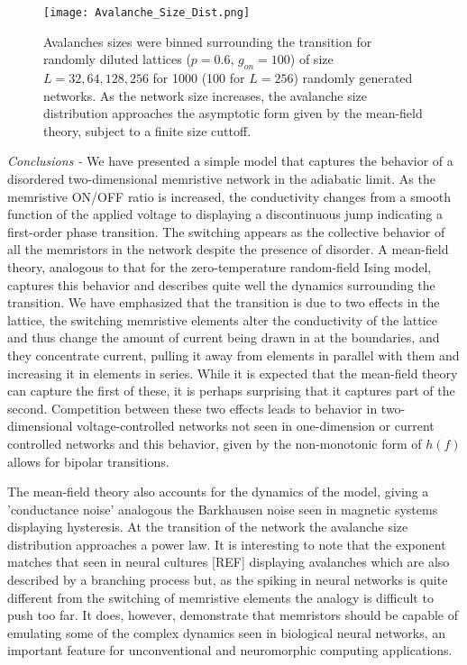 \documentclass[aps,prl,reprint,groupedaddress]{revtex4-1}
\begin{document}
\begin{figure}
\texttt{[image: Avalanche\_Size\_Dist.png]}
\caption{Avalanches sizes were binned surrounding the transition for randomly
diluted lattices ($p=0.6,\,g_{on}=100$) of size $L=32, 64, 128, 256$ for 1000
(100 for $L=256$) randomly generated networks.  As the network size increases,
the avalanche size distribution approaches the asymptotic form given by the
mean-field theory, subject to a finite size cuttoff.
\label{Avalanche_fig}}
\end{figure}

{\it Conclusions - } We have presented a simple model that captures the behavior of a disordered two-dimensional memristive
network in the adiabatic limit.  As the memristive ON/OFF ratio is increased,
the conductivity changes from a smooth function of the applied voltage to
displaying a discontinuous jump indicating a first-order phase transition. The switching appears as the collective behavior of all the memristors 
in the network despite the presence of disorder. 
A mean-field theory, analogous to that for the zero-temperature random-field Ising model, captures this behavior and describes quite well the dynamics
surrounding the transition.  We have emphasized that the transition is
due to two effects in the lattice, the switching memristive elements alter the
conductivity of the lattice and thus change the amount of current being drawn
in at the boundaries, and they concentrate current, pulling it away from
elements in parallel with them and increasing it in elements in series. While
it is expected that the mean-field theory can capture the first of these, it
is perhaps surprising that it captures part of the second.  Competition
between these two effects leads to behavior in two-dimensional 
voltage-controlled networks not seen in one-dimension or current controlled
networks and this behavior, given by the non-monotonic form of $h(f)$ allows
for bipolar transitions.

The mean-field theory also accounts for the dynamics of the model, giving
a 'conductance noise' analogous the Barkhausen noise seen in magnetic systems
displaying hysteresis.  At the transition of the network the avalanche
size distribution approaches a power law.  It is interesting to note that
the exponent matches that seen in neural cultures [REF] displaying avalanches which
are also described by a branching process but, as the spiking in neural
networks is quite different from the switching of memristive elements the
analogy is difficult to push too far.  It does, however, demonstrate that
memristors should be capable of emulating some of the complex dynamics seen in biological
neural networks, an important feature for unconventional and neuromorphic computing applications. 
\end{document}
